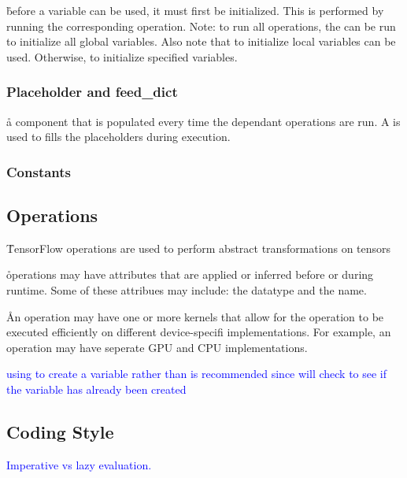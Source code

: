 \r{before a variable can be used, it must first be initialized.  This is performed by running the corresponding  operation.  Note: to run all  operations, the  can be run to initialize all global variables. Also note that to initialize local variables  can be used.  Otherwise,  to initialize specified variables.}

\subsubsection{Placeholder and feed\_dict}

\r{a component that is populated every time the dependant operations are run. A  is used to fills the placeholders during execution.}

\subsubsection{Constants}

\subsection{Operations}

\r{TensorFlow operations are used to perform abstract transformations on tensors}

\r{operations may have attributes that are applied or inferred before or during runtime.  Some of these attribues may include: the datatype and the name.}

\r{An operation may have one or more kernels that allow for the operation to be executed efficiently on different device-specifi implementations. For example, an operation may have seperate GPU and CPU implementations.}


\textcolor{blue}{using  to create a variable rather than  is recommended since  will check to see if the variable has already been created }

\subsection{Coding Style}

\textcolor{blue}{Imperative vs lazy evaluation.}

